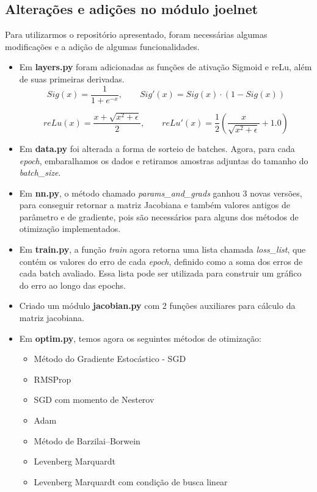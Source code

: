 \documentclass[11pt]{article}
\begin{document}
\subsection*{Alterações e adições no módulo joelnet}
Para utilizarmos o repositório apresentado, foram necessárias algumas modificações e a adição de algumas funcionalidades.
\begin{itemize}
\item Em \textbf{layers.py} foram adicionadas as funções de ativação Sigmoid e reLu, além de suas primeiras derivadas.
$$Sig(x) = \frac{1}{1 + e^{-x}} ,\qquad Sig'(x) = Sig(x)\cdot (1 - Sig(x)) $$

$$reLu(x) = \frac{x + \sqrt{x^2 + \epsilon}}{2} ,\qquad reLu'(x) = \frac{1}{2}\left(\frac{x}{\sqrt{x^2 + \epsilon}} + 1.0\right)$$

\item Em \textbf{data.py} foi alterada a forma de sorteio de batches. Agora, para cada \textit{epoch}, embaralhamos os dados e retiramos amostras adjuntas do tamanho do \textit{batch\_size}. 
\item Em \textbf{nn.py}, o método chamado \textit{params\_and\_grads} ganhou 3 novas versões, para conseguir retornar a matriz Jacobiana e também valores antigos de parâmetro e de gradiente, pois são necessários para alguns dos métodos de otimização implementados.
\item Em \textbf{train.py}, a função \textit{train} agora retorna uma lista chamada \textit{loss\_list}, que contém os valores do erro de cada \textit{epoch}, definido como a soma dos erros de cada batch avaliado. Essa lista pode ser utilizada para construir um gráfico do erro ao longo das epochs.
\item Criado um módulo \textbf{jacobian.py} com 2 funções auxiliares para cálculo da matriz jacobiana.
\item Em \textbf{optim.py}, temos agora os seguintes métodos de otimização:
\begin{itemize}
	\item Método do Gradiente Estocástico - SGD
	\item RMSProp
	\item SGD com momento de Nesterov
	\item Adam
	\item Método de Barzilai–Borwein
	\item Levenberg Marquardt
	\item Levenberg Marquardt com condição de busca linear
\end{itemize}


\end{itemize}
\end{document}

